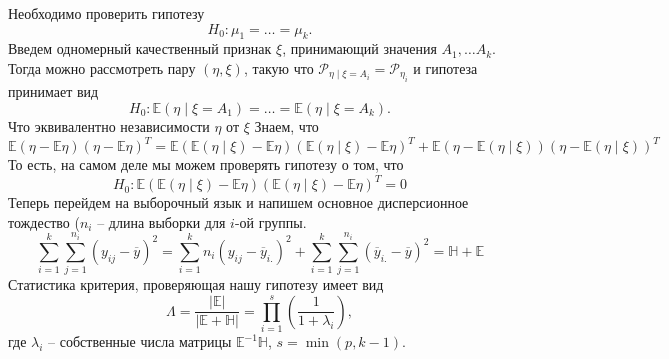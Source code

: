 Необходимо проверить гипотезу
\begin{equation*}
H_0: \mu_1 = \ldots = \mu_k.
\end{equation*}
Введем одномерный качественный признак $\xi$, принимающий значения $A_1, \ldots A_k$. Тогда можно рассмотреть пару $(\eta, \xi)$, такую что $\mathcal{P}_{\eta \mid \xi = A_i} = \mathcal{P}_{\eta_i}$ и гипотеза принимает вид
\begin{equation*}
H_0: \mathbb{E}(\eta \mid \xi = A_1) = \ldots = \mathbb{E}(\eta \mid \xi = A_k).
\end{equation*}
Что эквивалентно независимости $\eta$ от $\xi$
Знаем, что
\begin{equation*}
\mathbb{E}(\eta - \mathbb{E}\eta)(\eta - \mathbb{E}\eta)^T = \mathbb{E}(\mathbb{E}(\eta \mid \xi) - \mathbb{E}\eta)(\mathbb{E}(\eta \mid \xi) - \mathbb{E}\eta)^T + \mathbb{E}(\eta - \mathbb{E}(\eta \mid \xi))(\eta - \mathbb{E}(\eta \mid \xi))^T
\end{equation*}
То есть, на самом деле мы можем проверять гипотезу о том, что
\begin{equation*}
H_0: \mathbb{E}(\mathbb{E}(\eta \mid \xi) - \mathbb{E}\eta)(\mathbb{E}(\eta \mid \xi) - \mathbb{E}\eta)^T = 0
\end{equation*}
Теперь перейдем на выборочный язык и напишем основное дисперсионное тождество ($n_i$ -- длина выборки для $i$-ой группы.
\begin{equation*}
\sum\limits_{i = 1}^{k}\sum\limits_{j = 1}^{n_i}(y_{ij} - \overline{y})^2 = \sum\limits_{i = 1}^{k}n_i(y_{ij} - \overline{y}_{i.})^2  + \sum\limits_{i = 1}^{k}\sum\limits_{j = 1}^{n_i}(\overline{y}_{i.} - \overline{y})^2 = \mathbb{H} + \mathbb{E}
\end{equation*}
Статистика критерия, проверяющая нашу гипотезу имеет вид
\begin{equation}
\Lambda = \frac{|\mathbb{E}|}{|\mathbb{E} + \mathbb{H}|} = \prod\limits_{i = 1}^s (\frac{1}{1 + \lambda_i}),
\label{maov}
\end{equation}
где $\lambda_i$ -- собственные числа матрицы $\mathbb{E}^{-1} \mathbb{H}$, $s = \min(p, k-1).$

